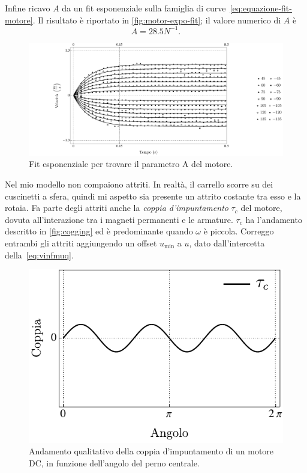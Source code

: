 Infine ricavo $A$ da un fit esponenziale sulla famiglia di curve~\eqref{eq:equazione-fit-motore}. Il risultato è riportato in \autoref{fig:motor-expo-fit}; il valore
numerico di $A$ è
\begin{equation*}
    A = 28.5 N^{-1}.
\end{equation*}

\begin{figure}[H]
    \centering
    \includegraphics[width=\textwidth]{assets/motor-expo-fit}
    \caption[Fit esponenziale per i parametri del motore]{
    Fit esponenziale per trovare il parametro A del motore.
    }
    \label{fig:motor-expo-fit}
\end{figure}

Nel mio modello non compaiono attriti.
In realtà, il carrello scorre su dei cuscinetti a sfera,
quindi mi aspetto sia presente un attrito costante tra esso e la rotaia.
Fa parte degli attriti anche la \emph{coppia d'impuntamento} $\tau_c$ del motore,
dovuta all'interazione tra i magneti permanenti e le armature. $\tau_c$ ha
l'andamento descritto in \autoref{fig:cogging} ed è predominante quando $\omega$ è
piccola.
Correggo entrambi gli attriti aggiungendo un offset $u_{\min} $ a $u$, dato dall'intercetta della~\eqref{eq:vinfmuq}.

 

\begin{figure}[H]
    \centering
    \includegraphics{assets/cogging-torque}
    \caption[Coppia d'impuntamento]{Andamento qualitativo della coppia d'impuntamento
    di un motore DC, in funzione dell'angolo del perno centrale.}
    \label{fig:cogging}
\end{figure}
